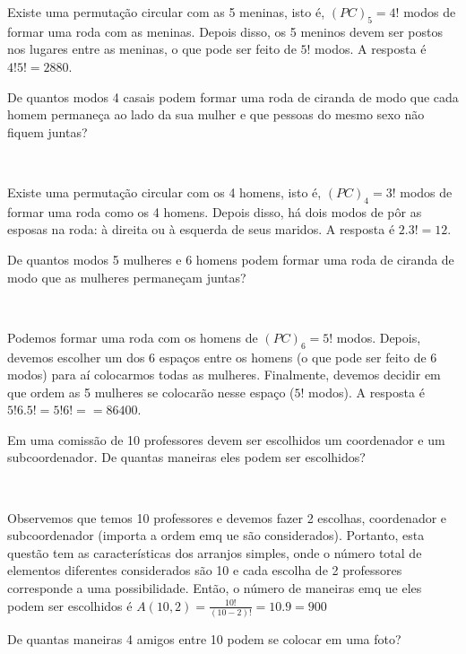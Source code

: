 \documentclass[a4paper, 12pt, addpoints]{exam}
\begin{document}
\begin{questions}
\begin{resp}
  Existe uma permutação circular com as 5 meninas, isto é, $(PC)_5 = 4!$ modos de formar uma roda com as meninas. Depois disso, os 5 meninos devem ser postos nos lugares entre as meninas, o que pode ser feito de $5!$ modos. A resposta é $4!5! = 2880$.
\end{resp}

\question De quantos modos 4 casais podem formar uma roda de ciranda de modo
que cada homem permaneça ao lado da sua mulher e que pessoas do
mesmo sexo não fiquem juntas?

\begin{resp}~

  Existe uma permutação circular com os 4 homens, isto é, $(PC)_4 = 3!$ modos de formar uma roda como os 4 homens. Depois disso, há dois modos de pôr as esposas na roda: à direita ou à esquerda de seus maridos. A resposta é $2 . 3! = 12$.
\end{resp}

\question De quantos modos 5 mulheres e 6 homens podem formar uma roda de
ciranda de modo que as mulheres permaneçam juntas?

\begin{resp}~

  Podemos formar uma roda com os homens de $(PC)_6 = 5!$ modos. Depois, devemos escolher um dos 6 espaços entre os homens (o que pode ser feito de 6 modos) para aí colocarmos todas as mulheres. Finalmente, devemos decidir em que ordem as 5 mulheres se colocarão nesse espaço ($5!$ modos). A resposta é $5!6 . 5! = 5!6! == 86400$.
\end{resp}

\question Em uma comissão de 10 professores devem ser escolhidos um coordenador e um subcoordenador. De quantas maneiras eles podem ser escolhidos?

\begin{resp}~

  Observemos que temos 10 professores e devemos fazer 2 escolhas, coordenador e subcoordenador (importa a ordem emq ue são considerados). Portanto, esta questão tem as características dos arranjos simples, onde o número total de elementos diferentes considerados são 10 e cada escolha de 2 professores corresponde a uma possibilidade. Então, o número de maneiras emq ue eles podem ser escolhidos é $A(10,2) = \frac{10!}{(10-2)!} = 10 . 9 = 900$
\end{resp}

\question De quantas maneiras 4 amigos entre 10 podem se colocar em uma foto?


\end{questions}
\end{document}
